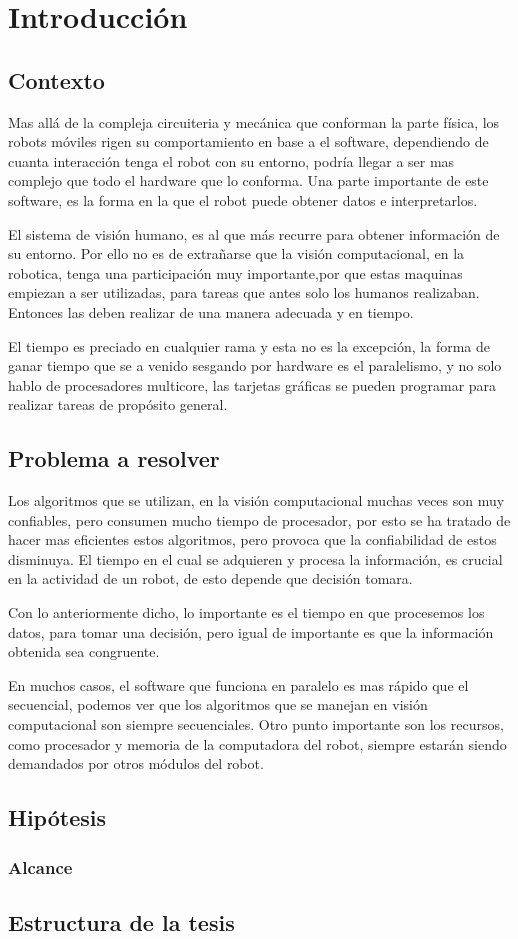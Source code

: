 \chapter{Introducción}

\section{Contexto}
Mas allá de la compleja circuiteria y mecánica que conforman la parte física, los robots móviles rigen su comportamiento en base a el software, dependiendo de cuanta interacción tenga el robot con su entorno, podría llegar a ser mas complejo que todo el hardware que lo conforma. Una parte importante de este software, es la forma en la que el robot puede obtener datos e interpretarlos. 

El sistema de visión humano, es al que más recurre para obtener información de su entorno. Por ello no es de extrañarse que la visión computacional, en la robotica, tenga una participación muy importante,por que estas maquinas empiezan a ser utilizadas, para tareas que antes solo los humanos realizaban. Entonces las deben realizar de una manera adecuada y en tiempo. 

El tiempo es preciado en cualquier rama y esta no es la excepción, la forma de ganar tiempo que se a venido sesgando por hardware es el paralelismo, y no solo hablo de procesadores multicore, las tarjetas gráficas se pueden programar para realizar tareas de propósito general.   

\section{Problema a resolver}
Los algoritmos que se utilizan, en la visión computacional muchas veces son muy confiables, pero consumen mucho tiempo de procesador, por esto se ha tratado de hacer mas eficientes estos algoritmos, pero provoca que  la confiabilidad de estos disminuya. El tiempo en el cual se adquieren y procesa la información, es crucial en la actividad de un robot, de esto depende que decisión tomara.

Con lo anteriormente dicho, lo importante es el tiempo en que procesemos los datos, para tomar una decisión, pero igual de importante es que la información obtenida sea congruente. 

En muchos casos, el software que funciona en paralelo es mas rápido que el secuencial, podemos ver que los algoritmos que se manejan en visión computacional son siempre secuenciales. Otro punto importante son los recursos, como procesador y memoria de la computadora del robot, siempre estarán siendo demandados por otros módulos del robot.    

\section{Hipótesis} 



\subsection{Alcance}

\section{Estructura de la tesis}
